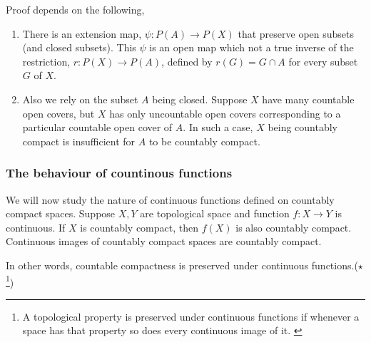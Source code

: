 \begin{remark}
	Proof depends on the following,
	\begin{enumerate}
		\item There is an extension map, $\psi : P(A) \to P(X)$ that preserve open subsets (and closed subsets).
			This $\psi$ is an open map which not a true inverse of the restriction, $r : P(X) \to P(A)$, defined by $r(G) = G \cap A$ for every subset $G$ of $X$.
		\item Also we rely on the subset $A$ being closed.
			Suppose $X$ have many countable open covers, but $X$ has only uncountable open covers corresponding to a particular countable open cover of $A$.
			In such a case, $X$ being countably compact is insufficient for $A$ to be countably compact.
	\end{enumerate}
\end{remark}

\subsubsection{The behaviour of countinous functions}
	We will now study the nature of continuous functions defined on countably compact spaces.
	Suppose $X,Y$ are topological space and function $f : X \to Y$ is continuous.
	If $X$ is countably compact, then $f(X)$ is also countably compact.
	Continuous images of countably compact spaces are countably compact.
\begin{commentary}
	In other words, countable compactness is preserved under continuous functions.($\star$\footnote{A topological property is preserved under continuous functions if whenever a space has that property so does every continuous image of it.
	\cite[6.1.9]{joshi}})
\end{commentary}
	
